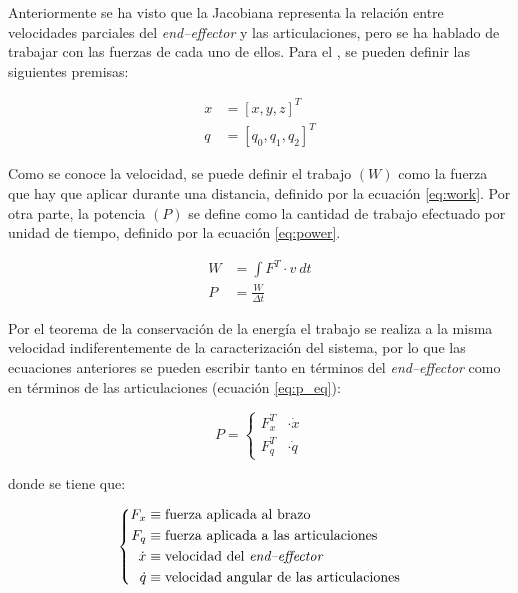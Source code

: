 Anteriormente se ha visto que la Jacobiana representa la relación entre velocidades
parciales del \textit{end--effector} y las articulaciones, pero se ha hablado de trabajar
con las fuerzas de cada uno de ellos. Para el \pArm{}, se pueden definir las siguientes
premisas:

\begin{align*}
    x &= \left[x, y, z\right]^T \\
    q &= \left[q_0, q_1, q_2\right]^T
\end{align*}

Como se conoce la velocidad, se puede definir el trabajo $\left(W\right)$ como la fuerza
que hay que aplicar durante una distancia, definido por la ecuación \ref{eq:work}. Por
otra parte, la potencia $\left(P\right)$ se define como la cantidad de trabajo efectuado
por unidad de tiempo\cite{PotenciaFisica2020}, definido por la ecuación \ref{eq:power}.

\begin{align}
    W &= \int{F^T \cdot v~dt} \label{eq:work} \\[1ex]
    P &= \frac{W}{\varDelta t} \label{eq:power}
\end{align}

Por el teorema de la conservación de la energía el trabajo se realiza a la misma
velocidad indiferentemente de la caracterización del sistema, por lo que las ecuaciones
anteriores se pueden escribir tanto en términos del \textit{end--effector}
como en términos de las articulaciones (ecuación \ref{eq:p_eq}):

\begin{equation}\label{eq:p_eq}
    P = \left\{\begin{aligned}
        F^T_x & \cdot \dot{x} \\
        F^T_q & \cdot \dot{q} 
    \end{aligned}\right.
\end{equation}

donde se tiene que:

\begin{equation*}
    \left\{\begin{aligned}
        F_x & \equiv \text{fuerza aplicada al brazo} \\
        F_q & \equiv \text{fuerza aplicada a las articulaciones} \\
        \dot{x} & \equiv \text{velocidad del \textit{end--effector}} \\
        \dot{q} & \equiv \text{velocidad angular de las articulaciones}
    \end{aligned}\right.
\end{equation*}

